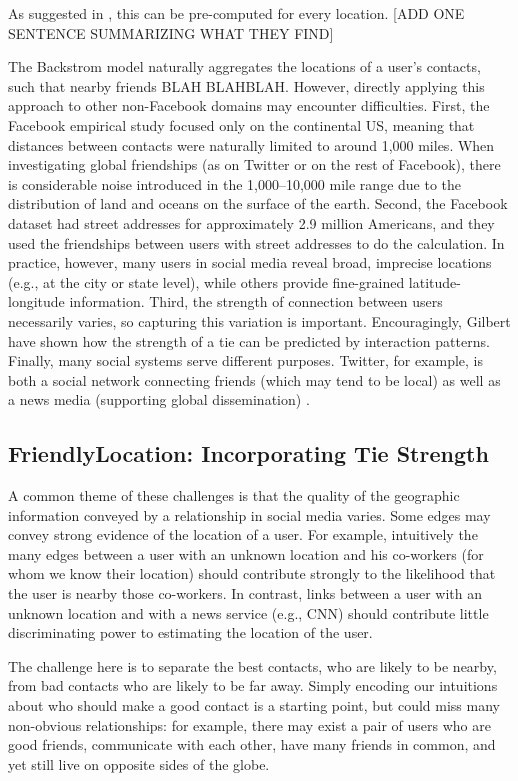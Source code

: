 \documentclass[letterpaper]{article}
\begin{document}
\noindent As suggested in \cite{backstrom2010find}, this can be pre-computed for every location. [ADD ONE SENTENCE SUMMARIZING WHAT THEY FIND] 


The Backstrom model naturally aggregates the locations of a user's contacts, such that nearby friends BLAH BLAHBLAH. However, directly applying this approach to other non-Facebook domains may encounter difficulties. First, the Facebook empirical study focused only on the continental US, meaning that distances between contacts were naturally limited to around 1,000 miles. When investigating global friendships (as on Twitter or on the rest of Facebook), there is considerable noise introduced in the 1,000--10,000 mile range due to the distribution of land and oceans on the surface of the earth. Second, the Facebook dataset had street addresses for approximately 2.9 million Americans, and they used the friendships between users with street addresses to do the calculation. In practice, however, many users in social media reveal broad, imprecise locations (e.g., at the city or state level), while others provide fine-grained latitude-longitude information. Third, the strength of connection between users necessarily varies, so capturing this variation is important. Encouragingly, Gilbert \cite{gilbert2009predicting} have shown how the strength of a tie can be predicted by interaction patterns.  Finally, many social systems serve different purposes. Twitter, for example, is both a social network connecting friends (which may tend to be local) as well as a news media (supporting global dissemination)  \cite{kwak2010why}.



\subsection{FriendlyLocation: Incorporating Tie Strength}
A common theme of these challenges is that the quality of the geographic information conveyed by a relationship in social media varies. Some edges may convey strong evidence of the location of a user. For example, intuitively the many edges between a user with an unknown location and his co-workers (for whom we know their location) should contribute strongly to the likelihood that the user is nearby those co-workers. In contrast, links between a user with an unknown location and with a news service (e.g., CNN) should contribute little discriminating power to estimating the location of the user. 

The challenge here is to separate the best contacts, who are likely to be nearby, from bad contacts who are likely to be far away. Simply encoding our intuitions about who should make a good contact is a starting point, but could miss many non-obvious relationships: for example, there may exist a pair of users who are good friends, communicate with each other, have many friends in common, and yet still live on opposite sides of the globe. 
\end{document}

